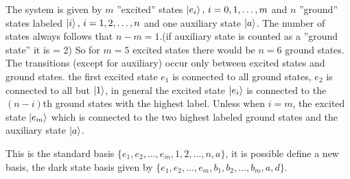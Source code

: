 \begin{figure}[H]
    \caption{}
\end{figure}


The system is given by $m$ ''excited'' states $\ket{e_i},\,i = 0,1,\dots,m$ and $n$ ''ground'' states labeled $\ket{i},\,i = 1,2,\dots,n$ and one auxiliary state $\ket{a}$. The number of states always follows that $n-m = 1$.(if auxiliary state is counted as a ''ground state'' it is = 2) So for $m = 5$ excited states there would be $n = 6$ ground states.
The transitions (except for auxiliary) occur only between excited states and ground states. the first excited state $e_1$ is connected to all ground states, $e_2$ is connected to all but $\ket{1}$, in general the excited state $\ket{e_i}$ is connected to the $(n - i)$th ground states with the highest label. Unless when $i = m$, the excited state $\ket{e_m}$ which is connected to the two highest labeled ground states and the auxiliary state $\ket{a}$.

This is the standard basis $\{e_1,e_2,\dots,e_m,1,2,\dots,n,a\}$, it is possible define a new basis, the dark state basis given by $\{e_1,e_2,\dots,e_m,b_1,b_2,\dots,b_{m},a,d\}$.

